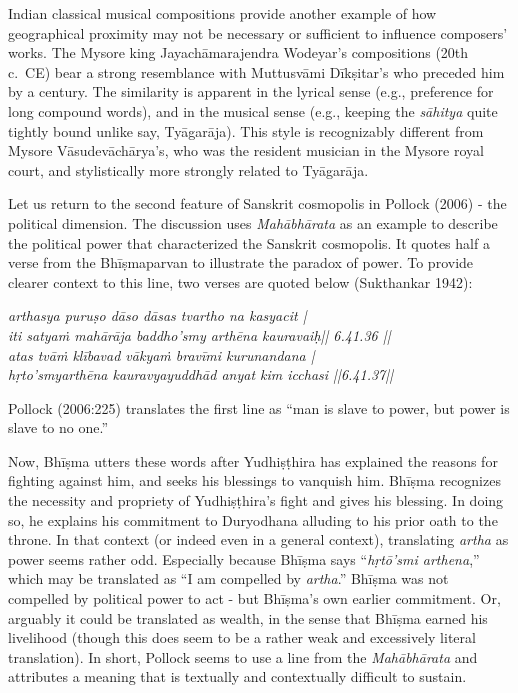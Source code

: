 Indian classical musical compositions provide another example of how geographical proximity may not be necessary or sufficient to influence composers’ works. The Mysore king Jayachāmarajendra Wodeyar’s compositions (20th c.\ CE) bear a strong resemblance with Muttusvāmi Dīkṣitar’s who preceded him by a century. The similarity is apparent in the lyrical sense (e.g., preference for long compound words), and in the musical sense (e.g., keeping the {\sl sāhitya} quite tightly bound unlike say, Tyāgarāja). This style is recognizably different from Mysore Vāsudevāchārya’s, who was the resident musician in the Mysore royal court, and stylistically more strongly related to Tyāgarāja. 

Let us return to the second feature of Sanskrit cosmopolis in Pollock (2006) - the political dimension. The discussion uses {\sl Mahābhārata} as an example to describe the political power that characterized the Sanskrit cosmopolis. It quotes half a verse from the Bhīṣmaparvan to illustrate the paradox of power. To provide clearer context to this line, two verses are quoted below (Sukthankar 1942):
\begin{myquote}
{\sl arthasya puruṣo dāso dāsas tvartho na kasyacit |\\
iti satyaṁ mahārāja baddho'smy arthēna kauravaiḥ|| 6.41.36 ||\\
atas tvāṁ klībavad vākyaṁ bravīmi kurunandana |\\
hṛto'smyarthēna kauravyayuddhād anyat kim icchasi ||6.41.37||}
\end{myquote}

Pollock (2006:225) translates the first line as “man is slave to power, but power is slave to no one.”

Now, Bhīṣma utters these words after Yudhiṣṭhira has explained the reasons for fighting against him, and seeks his blessings to vanquish him. Bhīṣma recognizes the necessity and propriety of Yudhiṣṭhira’s fight and gives his blessing. In doing so, he explains his commitment to Duryodhana alluding to his prior oath to the throne. In that context (or indeed even in a general context), translating {\sl artha} as power seems rather odd. Especially because Bhīṣma says “{\sl hṛtō'smi arthena},” which may be translated as “I am compelled by {\sl artha}.” Bhīṣma was not compelled by political power to act - but Bhīṣma's own earlier commitment. Or, arguably it could be translated as wealth, in the sense that Bhīṣma earned his livelihood (though this does seem to be a rather weak and excessively literal translation). In short, Pollock seems to use a line from the {\sl Mahābhārata} and attributes a meaning that is textually and contextually difficult to sustain.


